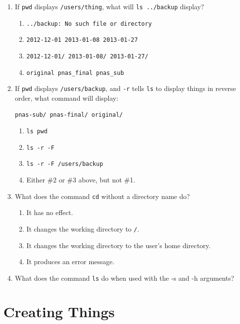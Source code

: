 \documentclass[]{book}
\begin{document}
\begin{enumerate}
\item
  If \texttt{pwd} displays \texttt{/users/thing}, what will
  \texttt{ls ../backup} display?

  \begin{enumerate}
  \item
    \texttt{../backup: No such file or directory}
  \item
    \texttt{2012-12-01 2013-01-08 2013-01-27}
  \item
    \texttt{2012-12-01/ 2013-01-08/ 2013-01-27/}
  \item
    \texttt{original pnas\_final pnas\_sub}
  \end{enumerate}
\item
  If \texttt{pwd} displays \texttt{/users/backup}, and \texttt{-r} tells
  \texttt{ls} to display things in reverse order, what command will
  display:

\begin{verbatim}
pnas-sub/ pnas-final/ original/
\end{verbatim}

  \begin{enumerate}
  \item
    \texttt{ls pwd}
  \item
    \texttt{ls -r -F}
  \item
    \texttt{ls -r -F /users/backup}
  \item
    Either \#2 or \#3 above, but not \#1.
  \end{enumerate}
\item
  What does the command \texttt{cd} without a directory name do?

  \begin{enumerate}
  \item
    It has no effect.
  \item
    It changes the working directory to \texttt{/}.
  \item
    It changes the working directory to the user's home directory.
  \item
    It produces an error message.
  \end{enumerate}
\item
  What does the command \texttt{ls} do when used with the -s and -h
  arguments?
\end{enumerate}

\section{Creating Things}
\end{document}
